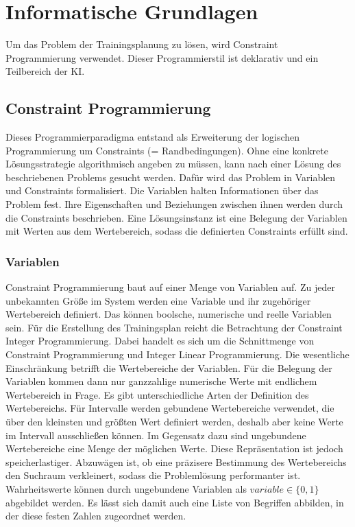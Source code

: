 \chapter{Informatische Grundlagen}
\label{sec:grundlagen:info}
Um das Problem der Trainingsplanung zu lösen, wird Constraint Programmierung verwendet. Dieser Programmierstil ist deklarativ und ein Teilbereich der KI.

\section{Constraint Programmierung}
Dieses Programmierparadigma entstand als Erweiterung der logischen Programmierung um Constraints (= Randbedingungen). Ohne eine konkrete Lösungsstrategie algorithmisch angeben zu müssen, kann nach einer Lösung des beschriebenen Problems gesucht werden. Dafür wird das Problem in Variablen und Constraints formalisiert. Die Variablen halten Informationen über das Problem fest. Ihre Eigenschaften und Beziehungen zwischen ihnen werden durch die Constraints beschrieben. Eine Lösungsinstanz ist eine Belegung der Variablen mit Werten aus dem Wertebereich, sodass die definierten Constraints erfüllt sind. \cite{EssentialsConstraintProgrammierung, HandbookConstraintProgramming}

\subsection{Variablen}
Constraint Programmierung baut auf einer Menge von Variablen auf. Zu jeder unbekannten Größe im System werden eine Variable und ihr zugehöriger Wertebereich definiert. Das können boolsche, numerische und reelle Variablen sein.
Für die Erstellung des Trainingsplan reicht die Betrachtung der Constraint Integer Programmierung. Dabei handelt es sich um die Schnittmenge von Constraint Programmierung und Integer Linear Programmierung. Die wesentliche Einschränkung betrifft die Wertebereiche der Variablen. Für die Belegung der Variablen kommen dann nur ganzzahlige numerische Werte mit endlichem Wertebereich in Frage.
Es gibt unterschiedliche Arten der Definition des Wertebereichs. Für Intervalle werden gebundene Wertebereiche verwendet, die über den kleinsten und größten Wert definiert werden, deshalb aber keine Werte im Intervall ausschließen können. Im Gegensatz dazu sind ungebundene Wertebereiche eine Menge der möglichen Werte. Diese Repräsentation ist jedoch speicherlastiger. Abzuwägen ist, ob eine präzisere Bestimmung des Wertebereichs den Suchraum verkleinert, sodass die Problemlösung performanter ist.
Wahrheitswerte können durch ungebundene Variablen als $variable \in \{0, 1\}$ abgebildet werden. Es lässt sich damit auch eine Liste von Begriffen abbilden, in der diese festen Zahlen zugeordnet werden. \cite{HandbookKnowledgeRepresentation}

